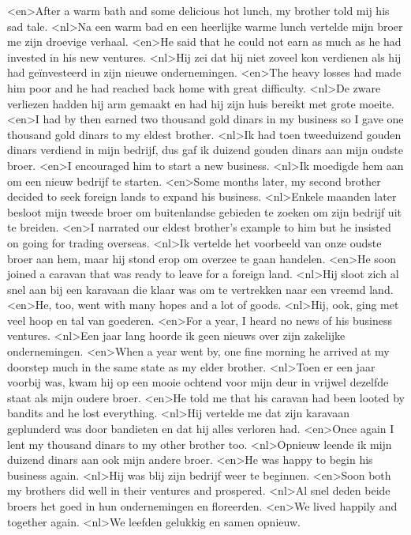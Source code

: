 <en>After a warm bath and some delicious hot lunch, my brother told mij his sad tale.
<nl>Na een warm bad en een heerlijke warme lunch vertelde mijn broer me zijn droevige verhaal.
<en>He said that he could not earn as much as he had invested in his new ventures.
<nl>Hij zei dat hij niet zoveel kon verdienen als hij had geïnvesteerd in zijn nieuwe ondernemingen.
<en>The heavy losses had made him poor and he had reached back home with great difficulty.
<nl>De zware verliezen hadden hij arm gemaakt en had hij zijn huis bereikt  met grote moeite.
<en>I had by then earned two thousand gold dinars in my business so I gave one thousand gold dinars to my eldest brother.
<nl>Ik had toen tweeduizend gouden dinars verdiend in mijn bedrijf, dus gaf ik duizend gouden dinars aan mijn oudste broer.
<en>I encouraged him to start a new business.
<nl>Ik moedigde hem aan om een nieuw bedrijf te starten.
<en>Some months later, my second brother decided to seek foreign lands to expand his business.
<nl>Enkele maanden later besloot mijn tweede broer om buitenlandse gebieden te zoeken om zijn bedrijf uit te breiden.
<en>I narrated our eldest brother's example to him but he insisted on going for trading overseas.
<nl>Ik vertelde het voorbeeld van onze oudste broer aan hem, maar hij stond erop om overzee te gaan handelen.
<en>He soon joined a caravan that was ready to leave for a foreign land.
<nl>Hij sloot zich al snel aan bij een karavaan die klaar was om te vertrekken  naar een vreemd land.
<en>He, too, went with many hopes and a lot of goods.
<nl>Hij, ook, ging met veel hoop en tal van goederen.
<en>For a year, I heard no news of his business ventures.
<nl>Een jaar lang hoorde ik geen nieuws over zijn zakelijke ondernemingen.
<en>When a year went by, one fine morning he arrived at my doorstep much in the same state as my elder brother.
<nl>Toen er een jaar voorbij was, kwam hij op een mooie ochtend voor mijn deur in vrijwel dezelfde staat als mijn oudere broer.
<en>He told me that his caravan had been looted by bandits and he lost everything.
<nl>Hij vertelde me dat zijn karavaan geplunderd was door bandieten en dat hij alles verloren had.
<en>Once again I lent my thousand dinars to my other brother too.
<nl>Opnieuw leende ik mijn duizend dinars aan ook mijn andere broer.
<en>He was happy to begin his business again.
<nl>Hij was blij zijn bedrijf weer te beginnen.
<en>Soon both my brothers did well in their ventures and prospered.
<nl>Al snel deden beide broers het goed in hun ondernemingen en floreerden.
<en>We lived happily and together again.
<nl>We leefden gelukkig en samen opnieuw.
